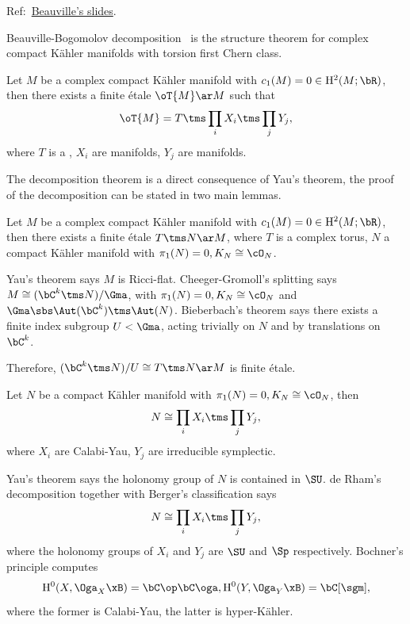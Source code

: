 \documentclass[a4paper, twoside]{article}
\begin{document}
\confighead{}{}{}



Ref:~\href{https://math.unice.fr/~beauvill/conf/decomp.pdf}{Beauville's slides}.

Beauville-Bogomolov decomposition~\cite{Bogomolov1974,Beauville1983Kahler} is the structure theorem for complex compact K{\"a}hler manifolds with torsion first Chern class.

\begin{thm}
	Let $M$ be a complex compact K{\"a}hler manifold with $c_{1}(M)=0\in \mathrm{H}_{}^{2}(M;\bR)$, then there exists a finite {\'e}tale $\oT{M}\ar M$ such that
	\[
		\oT{M}=T\tms\prod_{i}X_{i}\tms\prod_{j} Y_{j},
	\]
	where $T$ is a , $X_{i}$ are  manifolds, $Y_{j}$ are  manifolds.
\end{thm}


The decomposition theorem is a direct consequence of Yau's theorem\cite{Yau1978}, the proof of the decomposition can be stated in two main lemmas.


\begin{lem}
	Let $M$ be a complex compact K{\"a}hler manifold with $c_{1}(M)=0\in \mathrm{H}_{}^{2}(M;\bR)$, then there exists a finite {\'e}tale $T\tms N\ar M$, where $T$ is a complex torus, $N$ a compact K{\"a}hler manifold with $\pi_{1}(N)=0, K_{N}\cong\cO_{N}$.
\end{lem}

\begin{prf}
	Yau's theorem says $M$ is Ricci-flat. Cheeger-Gromoll's splitting says $M\cong(\bC^{k}\tms N)/\Gma$, with $\pi_{1}(N)=0, K_{N}\cong\cO_{N}$ and $\Gma\sbs\Aut(\bC^{k})\tms\Aut(N)$. Bieberbach's theorem says there exists a finite index subgroup $U<\Gma$, acting trivially on $N$ and by translations on $\bC^{k}$.

	Therefore, $(\bC^{k}\tms N)/U\cong T\tms N\ar M$ is finite {\'e}tale.
\end{prf}

\begin{lem}
	Let $N$ be a compact K{\"a}hler manifold with $\pi_{1}(N)=0, K_{N}\cong\cO_{N}$, then
	\[
		N\cong\prod_{i}X_{i}\tms\prod_{j}Y_{j},
	\]
	where $X_{i}$ are Calabi-Yau, $Y_{j}$ are irreducible symplectic.
\end{lem}

\begin{prf}
	Yau's theorem says the holonomy group of $N$ is contained in $\SU$. de Rham's decomposition together with Berger's classification says
	\[
		N\cong\prod_{i}X_{i}\tms\prod_{j}Y_{j},
	\]
	where the holonomy groups of $X_{i}$ and $Y_{j}$ are $\SU$ and $\Sp$ respectively. Bochner's principle computes
	\[
		\mathrm{H}_{}^{0}(X,\Oga_{X}\xB)=\bC\op\bC\oga, \mathrm{H}_{}^{0}(Y,\Oga_{Y}\xB)=\bC[\sgm],
	\]
	where the former is Calabi-Yau, the latter is hyper-K{\"a}hler.
\end{prf}
\end{document}
